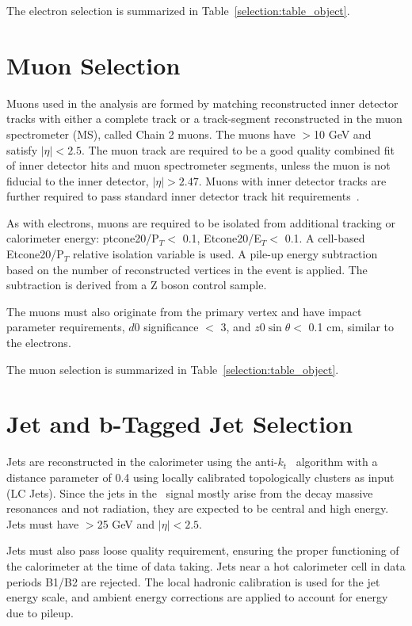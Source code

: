 The electron selection is summarized in Table~\ref{selection:table_object}. 


\section{Muon Selection}

Muons used in the analysis are formed by matching reconstructed inner detector
tracks with either a complete track or a track-segment reconstructed in the muon spectrometer (MS),
called Chain 2 muons. The muons have \pt$>$10 GeV and satisfy $|\eta| < 2.5$.
The muon track are required to be a good quality combined fit of inner detector hits and muon
spectrometer segments, unless the muon is not fiducial to the
inner detector, $|\eta| > 2.47$.  Muons with inner detector tracks are further required
to pass standard inner detector track hit requirements~\cite{MCP2012}.  

As with electrons, muons are required to be isolated from 
additional tracking or calorimeter energy: ptcone20/P$_T <$ 0.1, Etcone20/E$_T <$ 0.1. A cell-based Etcone20/P$_T$ relative
isolation variable is used. A pile-up energy subtraction based 
on the number of reconstructed vertices in the event is applied. The
subtraction is derived from a Z boson control sample.


The muons must also originate from the primary vertex and have impact parameter requirements, $d0$ significance $<$ 3, and $z0\sin{\theta} <$ 0.1 cm, similar to the electrons. 


The muon selection is summarized in Table~\ref{selection:table_object}. 

\section{Jet and b-Tagged Jet Selection}

Jets are reconstructed in the calorimeter using the anti-$k_t$~\cite{Cacciari:2008gp} algorithm
with a distance parameter of 0.4 using locally calibrated
topologically clusters as input (LC Jets). Since the jets in the \tth\
signal mostly arise from the decay massive resonances and not radiation,
they are expected to be central and high energy. Jets must have \pt$>$25 GeV and 
$|\eta|<2.5$. 

Jets must also pass loose quality requirement, ensuring the proper
functioning of the calorimeter at the time of data taking. Jets near a hot calorimeter cell in data periods
B1/B2 are rejected. The local hadronic calibration is used for
the jet energy scale, and ambient energy corrections are applied to account
for energy due to pileup.

